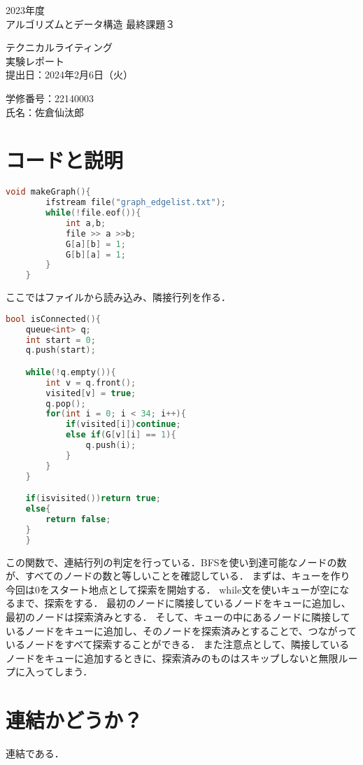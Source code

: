 \documentclass[fleqn, a4paper. 12pt]{ltjsarticle}
\begin{document}
\begin{titlepage}
      \begin{center}
      {
      \Huge 2023年度\\アルゴリズムとデータ構造 最終課題３}
      
      \vspace{4cm}
             {\Huge テクニカルライティング\\
               実験レポート\\}
             \vspace{4cm}
                    {\large 提出日：2024年2月6日（火）\\}
                    
                    {\large 学修番号：22140003\\氏名：佐倉仙汰郎}
    \end{center}  
  \end{titlepage}

  \section{コードと説明}
  \begin{lstlisting}[language=C++]
    void makeGraph(){
        ifstream file("graph_edgelist.txt");
        while(!file.eof()){
            int a,b;
            file >> a >>b;
            G[a][b] = 1;
            G[b][a] = 1;
        }
    }
    \end{lstlisting}
    ここではファイルから読み込み、隣接行列を作る．\\


    \begin{lstlisting}[language=C++]
        bool isConnected(){
    queue<int> q;
    int start = 0;
    q.push(start);

    while(!q.empty()){
        int v = q.front();
        visited[v] = true;
        q.pop();
        for(int i = 0; i < 34; i++){
            if(visited[i])continue;
            else if(G[v][i] == 1){
                q.push(i);
            }
        }
    }

    if(isvisited())return true;
    else{
        return false;
    }
    }
    \end{lstlisting}
    この関数で、連結行列の判定を行っている．BFSを使い到達可能なノードの数が、すべてのノードの数と等しいことを確認している．
    まずは、キューを作り今回は0をスタート地点として探索を開始する．
    while文を使いキューが空になるまで、探索をする．
    最初のノードに隣接しているノードをキューに追加し、最初のノードは探索済みとする．
    そして、キューの中にあるノードに隣接しているノードをキューに追加し、そのノードを探索済みとすることで、つながっているノードをすべて探索することができる．
    また注意点として、隣接しているノードをキューに追加するときに、探索済みのものはスキップしないと無限ループに入ってしまう．

    \section{連結かどうか？}
    連結である．
\end{document}
